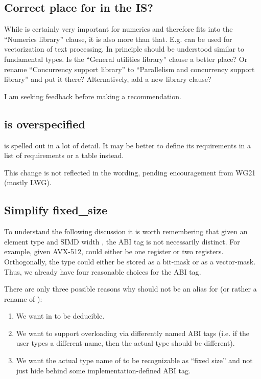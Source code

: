 \subsection{Correct place for  in the IS?}

While  is certainly very important for numerics and therefore fits into the “Numerics library” clause, it is also more than that.
E.g.  can be used for vectorization of text processing.
In principle  should be understood similar to fundamental types.
Is the “General utilities library” clause a better place?
Or rename “Concurrency support library” to “Parallelism and concurrency support library” and put it there?
Alternatively, add a new library clause?

I am seeking feedback before making a recommendation.

\subsection{ is overspecified}
 is spelled out in a lot of detail.
It may be better to define its requirements in a list of requirements or a table instead.

This change is not reflected in the wording, pending encouragement from WG21 (mostly LWG).

\subsection{Simplify fixed_size}\label{sec:simplifyfixedsize}
To understand the following discussion it is worth remembering that given an
element type  and SIMD width , the ABI tag is not necessarily
distinct.
For example, given AVX-512,  could either be
one  register or two  registers.
Orthogonally, the  type could either be stored as a bit-mask or
as a vector-mask.
Thus, we already have four reasonable choices for the ABI tag.

There are only three possible reasons why \simdabi{} should
not be an alias for \simdabi{} (or rather a rename of
):
\begin{enumerate}
  \item We want  in  to be deducible.

  \item We want to support overloading via differently named ABI tags (i.e. if
    the user types a different name, then the actual type should be different).

  \item We want the actual type name of \simdabi{} to be
    recognizable as ``fixed size'' and not just hide behind some
    implementation-defined ABI tag.
\end{enumerate}

